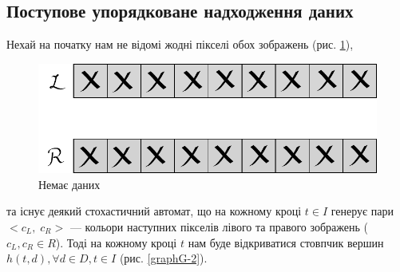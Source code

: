 \subsection{Поступове упорядковане надходження даних}
Нехай на початку нам не відомі жодні пікселі обох зображень (рис. \ref{2.1nodata}),
\begin{figure}[h!]
	\centering
	\includegraphics[scale = 0.8]{allclosed2.pdf}
	\caption{Немає даних}
	\label{2.1nodata}
\end{figure}
та існує деякий стохастичний автомат, що на кожному кроці $ t \in I $ генерує пари $<c_L, \;c_R>$ --- кольори наступних пікселів лівого та правого зображень ($ c_L, c_R \in R $).
Тоді на кожному кроці $ t $ нам буде відкриватися стовпчик вершин $  h(t, d), \forall d \in D, t \in I $ (рис. \ref{graphG-2}).
